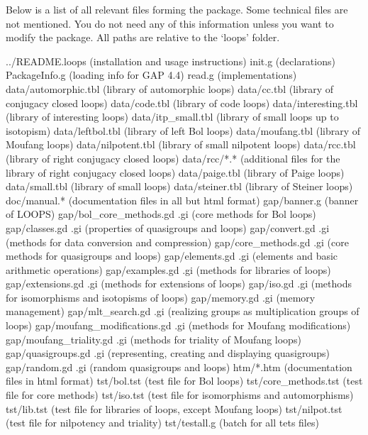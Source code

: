 
Below is a list of all relevant files forming the {\LOOPS} package. Some technical files are not mentioned. You do not need any of this information unless you want to modify the package. All paths are relative to the `loops' folder.

\begintt
../README.loops (installation and usage instructions)
init.g (declarations)
PackageInfo.g (loading info for GAP 4.4)
read.g (implementations)
data/automorphic.tbl (library of automorphic loops)
data/cc.tbl (library of conjugacy closed loops)
data/code.tbl (library of code loops)
data/interesting.tbl (library of interesting loops)
data/itp_small.tbl (library of small loops up to isotopism)
data/leftbol.tbl (library of left Bol loops)
data/moufang.tbl (library of Moufang loops)
data/nilpotent.tbl (library of small nilpotent loops)
data/rcc.tbl (library of right conjugacy closed loops)
data/rcc/*.* (additional files for the library of right conjugacy closed loops)
data/paige.tbl (library of Paige loops)
data/small.tbl (library of small loops)
data/steiner.tbl (library of Steiner loops)
doc/manual.* (documentation files in all but html format)
gap/banner.g (banner of LOOPS)
gap/bol_core_methods.gd .gi (core methods for Bol loops)
gap/classes.gd .gi (properties of quasigroups and loops)
gap/convert.gd .gi (methods for data conversion and compression)
gap/core_methods.gd .gi (core methods for quasigroups and loops)
gap/elements.gd .gi (elements and basic arithmetic operations)
gap/examples.gd .gi (methods for libraries of loops)
gap/extensions.gd .gi (methods for extensions of loops)
gap/iso.gd .gi (methods for isomorphisms and isotopisms of loops)
gap/memory.gd .gi (memory management)
gap/mlt_search.gd .gi (realizing groups as multiplication groups of loops)
gap/moufang_modifications.gd .gi (methods for Moufang modifications)
gap/moufang_triality.gd .gi (methods for triality of Moufang loops)
gap/quasigroups.gd .gi (representing, creating and displaying quasigroups)
gap/random.gd .gi (random quasigroups and loops)
htm/*.htm (documentation files in html format)
tst/bol.tst (test file for Bol loops)
tst/core_methods.tst (test file for core methods)
tst/iso.tst (test file for isomorphisms and automorphisms)
tst/lib.tst (test file for libraries of loops, except Moufang loops)
tst/nilpot.tst (test file for nilpotency and triality)
tst/testall.g (batch for all tets files)
\endtt
